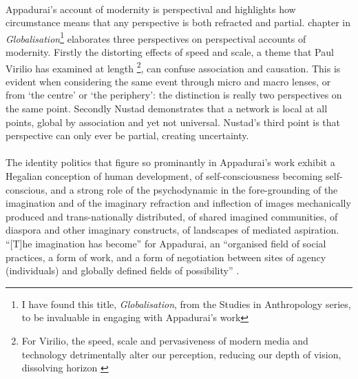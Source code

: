 \documentclass{article}
\begin{document}
\begin{doublespacing}
\paragraph{}Appadurai's account of modernity is perspectival and highlights how circumstance means that any perspective is both refracted and partial.  chapter in  \emph{Globalisation}\footnote{I have found this title, \emph{Globalisation}, from the Studies in Anthropology series, to be invaluable in engaging with Appadurai's work} elaborates three perspectives on perspectival accounts of modernity. Firstly the distorting effects of speed and scale, a theme that Paul Virilio has examined at length \footnote{For Virilio, the speed, scale and pervasiveness of modern media and technology detrimentally alter our perception, reducing our depth of vision, dissolving horizon \cite{Virilio:2005jl,Virilio:2006sp}}, can confuse association and causation. This is evident when considering the same event through micro and macro lenses, or from `the centre' or `the periphery': the distinction is really two perspectives on the same point. Secondly Nustad demonstrates that a network is local at all points, global by association and yet not universal. Nustad's third point is that perspective can only ever be partial, creating uncertainty.

\paragraph{}The identity politics that figure so prominantly in Appadurai's work exhibit a Hegalian conception of human development, of self-consciousness becoming self-conscious, and a strong role of the psychodynamic in the fore-grounding of the imagination and of the imaginary refraction and inflection of images mechanically produced and trans-nationally distributed, of shared imagined communities, of diaspora and other imaginary constructs, of landscapes of mediated aspiration. ``[T]he imagination has become'' for Appadurai, an ``organised field of social practices, a form of work, and a form of negotiation between sites of agency (individuals) and globally defined fields of possibility'' \cite[p.31]{Appadurai:1996lp}.


\end{doublespacing}
\end{document}
